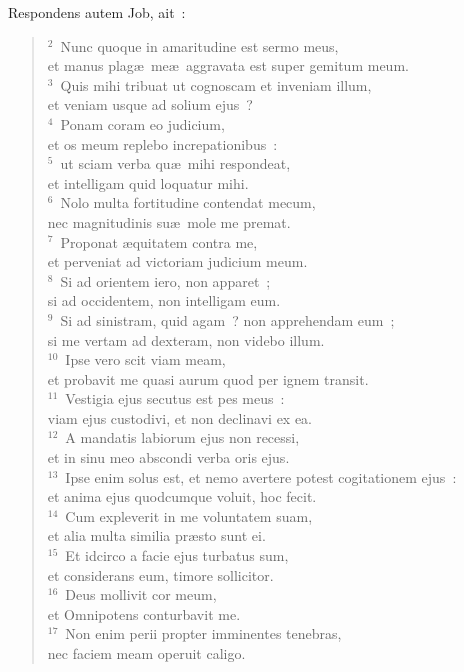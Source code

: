 \lettrine[lines=10,image=true,loversize=0.05,lraise=-0.03]{R}{}espondens autem Job, ait~:
\begin{flushleft}\begin{verse}\vspace{6pt}${}^{2}$~Nunc quoque in amaritudine est sermo meus,\\ et manus plag\ae\ me\ae\ aggravata est super gemitum meum.\\
${}^{3}$~Quis mihi tribuat ut cognoscam et inveniam illum,\\ et veniam usque ad solium ejus~?\\
${}^{4}$~Ponam coram eo judicium,\\ et os meum replebo increpationibus~:\\
${}^{5}$~ut sciam verba qu\ae\ mihi respondeat,\\ et intelligam quid loquatur mihi.\\
${}^{6}$~Nolo multa fortitudine contendat mecum,\\ nec magnitudinis su\ae\ mole me premat.\\
${}^{7}$~Proponat \ae quitatem contra me,\\ et perveniat ad victoriam judicium meum.\\
${}^{8}$~Si ad orientem iero, non apparet~;\\ si ad occidentem, non intelligam eum.\\
${}^{9}$~Si ad sinistram, quid agam~? non apprehendam eum~;\\ si me vertam ad dexteram, non videbo illum.\\
${}^{10}$~Ipse vero scit viam meam,\\ et probavit me quasi aurum quod per ignem transit.\\
${}^{11}$~Vestigia ejus secutus est pes meus~:\\ viam ejus custodivi, et non declinavi ex ea.\\
${}^{12}$~A mandatis labiorum ejus non recessi,\\ et in sinu meo abscondi verba oris ejus.\\
${}^{13}$~Ipse enim solus est, et nemo avertere potest cogitationem ejus~:\\ et anima ejus quodcumque voluit, hoc fecit.\\
${}^{14}$~Cum expleverit in me voluntatem suam,\\ et alia multa similia pr\ae sto sunt ei.\\
${}^{15}$~Et idcirco a facie ejus turbatus sum,\\ et considerans eum, timore sollicitor.\\
${}^{16}$~Deus mollivit cor meum,\\ et Omnipotens conturbavit me.\\
${}^{17}$~Non enim perii propter imminentes tenebras,\\ nec faciem meam operuit caligo.\end{verse}\end{flushleft}


